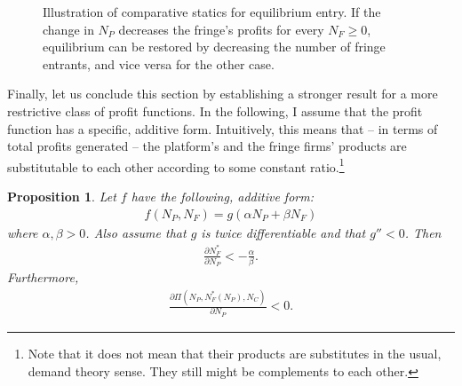 \documentclass[a4paper]{article}
\newtheorem{proposition}{Proposition}
\begin{document}
\begin{figure}[ht]
    \centering
    \caption{Illustration of comparative statics for equilibrium entry. If the change in $N_P$ decreases the fringe's profits for every $N_F \geq 0$, equilibrium can be restored by decreasing the number of fringe entrants, and vice versa for the other case.}
    \label{fig:comparative_N_F}
\end{figure}

Finally, let us conclude this section by establishing a stronger result for a more restrictive class of profit functions.
In the following, I assume that the profit function has a specific, additive form.
Intuitively, this means that -- in terms of total profits generated -- the platform's and the fringe firms' products are substitutable to each other according to some constant ratio.\footnote{
    Note that it does not mean that their products are substitutes in the usual, demand theory sense.
    They still might be complements to each other.
}
\begin{proposition}
    \label{prop:aggregate_size_additive}
    Let $f$ have the following, additive form:
    \begin{align*}
        f(N_P, N_F) = g(\alpha N_P + \beta N_F)
    \end{align*}
    where $\alpha, \beta > 0$.
    Also assume that $g$ is twice differentiable and that $g'' < 0$.
    Then
    \begin{align*}
        \frac{\partial N_F^*}{\partial N_P} < -\frac{\alpha}{\beta}.
    \end{align*}
    Furthermore,
    \begin{align*}
        \frac{\partial \Pi(N_P, N_F^*(N_P), N_C)}{\partial N_P} < 0.
    \end{align*}
\end{proposition}
\end{document}
